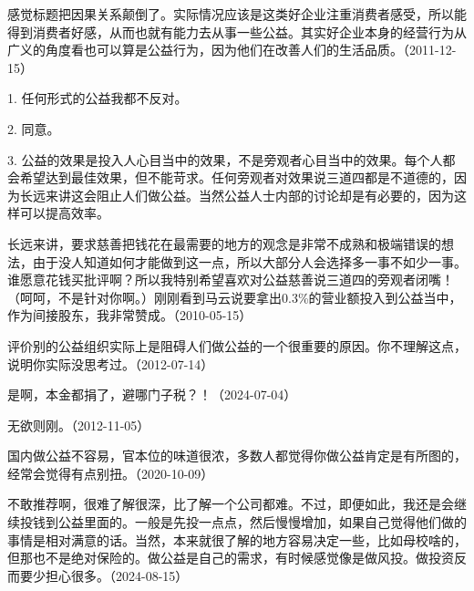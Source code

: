 感觉标题把因果关系颠倒了。实际情况应该是这类好企业注重消费者感受，所以能得到消费者好感，从而也就有能力去从事一些公益。其实好企业本身的经营行为从广义的角度看也可以算是公益行为，因为他们在改善人们的生活品质。（2011-12-15）


1. 任何形式的公益我都不反对。

2. 同意。

3. 公益的效果是投入人心目当中的效果，不是旁观者心目当中的效果。每个人都会希望达到最佳效果，但不能苛求。任何旁观者对效果说三道四都是不道德的，因为长远来讲这会阻止人们做公益。当然公益人士内部的讨论却是有必要的，因为这样可以提高效率。

长远来讲，要求慈善把钱花在最需要的地方的观念是非常不成熟和极端错误的想法，由于没人知道如何才能做到这一点，所以大部分人会选择多一事不如少一事。谁愿意花钱买批评啊？所以我特别希望喜欢对公益慈善说三道四的旁观者闭嘴！（呵呵，不是针对你啊。）刚刚看到马云说要拿出0.3\%的营业额投入到公益当中，作为间接股东，我非常赞成。（2010-05-15）

评价别的公益组织实际上是阻碍人们做公益的一个很重要的原因。你不理解这点，说明你实际没思考过。（2012-07-14）


是啊，本金都捐了，避哪门子税？！（2024-07-04）


无欲则刚。（2012-11-05）

国内做公益不容易，官本位的味道很浓，多数人都觉得你做公益肯定是有所图的，经常会觉得有点别扭。（2020-10-09）


不敢推荐啊，很难了解很深，比了解一个公司都难。不过，即便如此，我还是会继续投钱到公益里面的。一般是先投一点点，然后慢慢增加，如果自己觉得他们做的事情是相对满意的话。当然，本来就很了解的地方容易决定一些，比如母校啥的，但那也不是绝对保险的。做公益是自己的需求，有时候感觉像是做风投。做投资反而要少担心很多。（2024-08-15）
